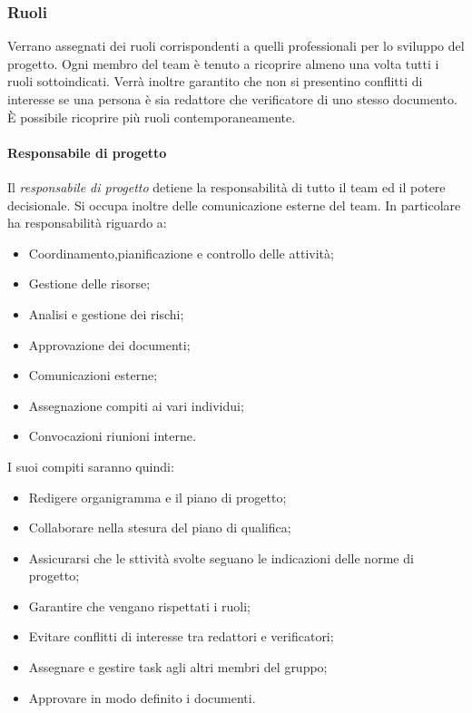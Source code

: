 	\subsubsection{Ruoli} \label{sec:ruoli}
		Verrano assegnati dei ruoli corrispondenti a quelli professionali per lo sviluppo del progetto.
		Ogni membro del team è tenuto a ricoprire almeno una volta tutti i ruoli sottoindicati. Verrà inoltre garantito che non si presentino conflitti di interesse se una persona è sia redattore che verificatore di uno stesso documento. È possibile ricoprire più ruoli contemporaneamente.
			\paragraph{Responsabile di progetto}
				Il \textit{responsabile di progetto} detiene la responsabilità di tutto il team ed il potere decisionale. Si occupa inoltre delle comunicazione esterne del team.
				In particolare ha responsabilità riguardo a:
				\begin{itemize}
					\item Coordinamento,pianificazione e controllo delle attività;
					\item Gestione delle risorse;
					\item Analisi e gestione dei rischi;
					\item Approvazione dei documenti;
					\item Comunicazioni esterne;
					\item Assegnazione compiti ai vari individui;
					\item Convocazioni riunioni interne.
				\end{itemize}
				I suoi compiti saranno quindi:
				\begin{itemize}
					\item Redigere organigramma e il piano di progetto;
					\item Collaborare nella stesura del piano di qualifica;
					\item Assicurarsi che le sttività svolte seguano le indicazioni delle norme di progetto;
					\item Garantire che vengano rispettati i ruoli;
					\item Evitare conflitti di interesse tra redattori e verificatori;
					\item Assegnare e gestire task agli altri membri del gruppo;
					\item Approvare in modo definito i documenti.
				\end{itemize}
